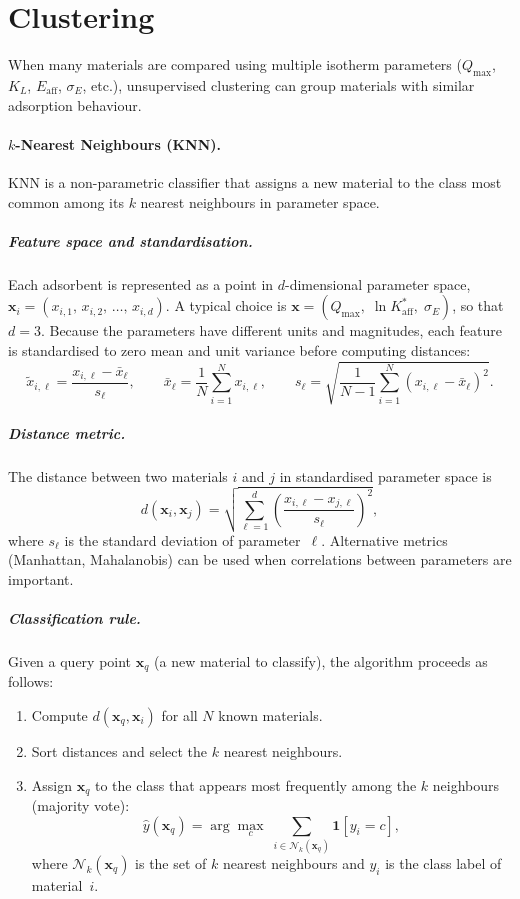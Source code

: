 ﻿	\section{Clustering}

	When many materials are compared using multiple isotherm parameters
	($Q_{\max}$, $K_L$, $E_{\mathrm{aff}}$, $\sigma_E$, etc.),
	unsupervised clustering can group materials with similar adsorption
	behaviour.

	\paragraph{$k$-Nearest Neighbours (KNN).}
	KNN is a non-parametric classifier that assigns a new material to
	the class most common among its $k$ nearest neighbours in
	parameter space.

	\subparagraph{Feature space and standardisation.}
	Each adsorbent is represented as a point in $d$-dimensional
	parameter space,
	$\mathbf{x}_i = (x_{i,1},\, x_{i,2},\, \ldots,\, x_{i,d})$.
	A typical choice is
	$\mathbf{x} = (Q_{\max},\; \ln K_{\mathrm{aff}}^{\ast},\;
	\sigma_E)$, so that $d = 3$.
	Because the parameters have different units and magnitudes,
	each feature is standardised to zero mean and unit variance
	before computing distances:
	\begin{equation}
		\tilde{x}_{i,\ell}
		= \frac{x_{i,\ell} - \bar{x}_\ell}{s_\ell},
		\qquad
		\bar{x}_\ell = \frac{1}{N}\sum_{i=1}^{N} x_{i,\ell},
		\qquad
		s_\ell = \sqrt{\frac{1}{N-1}\sum_{i=1}^{N}
			(x_{i,\ell} - \bar{x}_\ell)^2}.
	\end{equation}

	\subparagraph{Distance metric.}
	The distance between two materials $i$ and $j$ in standardised
	parameter space is
	\begin{equation}
		d(\mathbf{x}_i, \mathbf{x}_j)
		= \sqrt{\sum_{\ell=1}^{d}
			\left(\frac{x_{i,\ell} - x_{j,\ell}}{s_\ell}\right)^{\!2}},
		\label{eq:KNN_distance}
	\end{equation}
	where $s_\ell$ is the standard deviation of parameter~$\ell$.
	Alternative metrics (Manhattan, Mahalanobis) can be used when
	correlations between parameters are important.

	\subparagraph{Classification rule.}
	Given a query point $\mathbf{x}_q$ (a new material to classify),
	the algorithm proceeds as follows:
	\begin{enumerate}
		\item Compute $d(\mathbf{x}_q, \mathbf{x}_i)$ for all $N$
		known materials.
		\item Sort distances and select the $k$ nearest neighbours.
		\item Assign $\mathbf{x}_q$ to the class that appears most
		frequently among the $k$ neighbours (majority vote):
		\begin{equation}
			\hat{y}(\mathbf{x}_q)
			= \arg\max_{c}\;
			\sum_{i \in \mathcal{N}_k(\mathbf{x}_q)}
			\mathbf{1}[y_i = c],
			\label{eq:KNN_vote}
		\end{equation}
		where $\mathcal{N}_k(\mathbf{x}_q)$ is the set of $k$
		nearest neighbours and $y_i$ is the class label of
		material~$i$.
	\end{enumerate}

